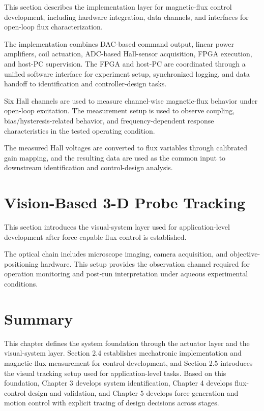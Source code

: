This section describes the implementation layer for magnetic-flux control development, including hardware integration, data channels, and interfaces for open-loop flux characterization.

The implementation combines DAC-based command output, linear power amplifiers, coil actuation, ADC-based Hall-sensor acquisition, FPGA execution, and host-PC supervision. The FPGA and host-PC are coordinated through a unified software interface for experiment setup, synchronized logging, and data handoff to identification and controller-design tasks.

Six Hall channels are used to measure channel-wise magnetic-flux behavior under open-loop excitation. The measurement setup is used to observe coupling, bias/hysteresis-related behavior, and frequency-dependent response characteristics in the tested operating condition.

The measured Hall voltages are converted to flux variables through calibrated gain mapping, and the resulting data are used as the common input to downstream identification and control-design analysis.

\section{Vision-Based 3-D Probe Tracking}

This section introduces the visual-system layer used for application-level development after force-capable flux control is established.

The optical chain includes microscope imaging, camera acquisition, and objective-positioning hardware. This setup provides the observation channel required for operation monitoring and post-run interpretation under aqueous experimental conditions.

\section{Summary}

This chapter defines the system foundation through the actuator layer and the visual-system layer. Section 2.4 establishes mechatronic implementation and magnetic-flux measurement for control development, and Section 2.5 introduces the visual tracking setup used for application-level tasks. Based on this foundation, Chapter 3 develops system identification, Chapter 4 develops flux-control design and validation, and Chapter 5 develops force generation and motion control with explicit tracing of design decisions across stages.
